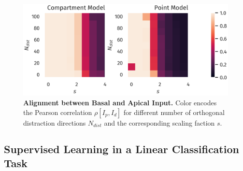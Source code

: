 \documentclass[utf8]{frontiersSCNS} %
\begin{document}
\begin{figure}
\centering
\includegraphics[width=0.7\columnwidth]{corr_dimension_scaling_high_input_dim}
\caption{{\bf Alignment between Basal and Apical Input.} Color
	encodes the Pearson correlation $\rho[I_p,I_d]$ for different
	number of orthogonal distraction directions $N_{dist}$ 
	and the corresponding scaling faction $s$.}
\label{fig:corr_dimension_scaling}
\end{figure}

\subsection{Supervised Learning in a Linear Classification Task}
\label{sect:classification}
\end{document}
